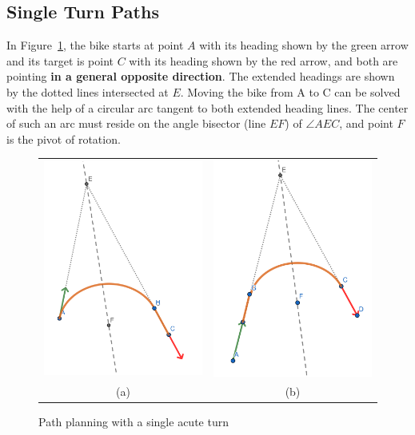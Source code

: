 \documentclass{article}
\begin{document}
\subsection*{Single Turn Paths}
In Figure~\ref{fig:path1turnacute}, the bike starts at point $A$ with its heading shown by
the green arrow and its target is point $C$ with its heading shown by the red arrow,
and both are pointing \textbf{in a general opposite direction}.
The extended headings are shown by the dotted lines intersected at $E$.
Moving the bike from A to C can be solved with the help of a circular arc
tangent to both extended heading lines. The center of such an arc must reside
on the angle bisector (line $EF$) of $\angle AEC$, and point $F$ is the
pivot of rotation.

\begin{figure}[hbt]
  \begin{tabular}{cc}
    \includegraphics[width=6cm]{screenshots/single-acute-turn-rot-trans.png} & 
    \includegraphics[width=6cm]{screenshots/single-acute-turn-trans-rot.png}       \\
    (a)                                                                      & (b) \\
  \end{tabular}
  \caption{Path planning with a single acute turn}
  \label{fig:path1turnacute}
\end{figure}
\end{document}
